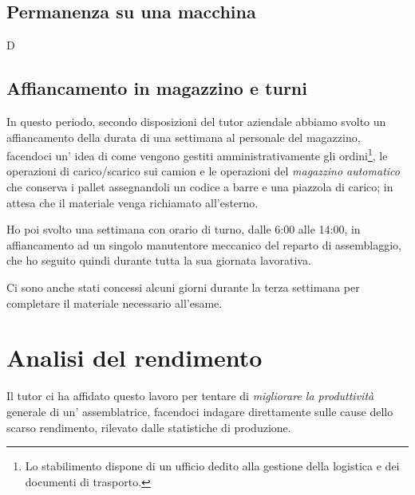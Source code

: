 \documentclass[a4paper,14pt,twoside]{extarticle} %
\begin{document}
\subsection{Permanenza su una macchina}
D
\subsection{Affiancamento in magazzino e turni}
In questo periodo, secondo disposizioni del tutor aziendale abbiamo svolto un affiancamento della durata di una settimana al personale del magazzino, facendoci un' idea di come vengono gestiti amministrativamente gli ordini\footnote{Lo stabilimento dispone di un ufficio dedito alla gestione della logistica e dei documenti di trasporto.}, le operazioni di carico/scarico sui camion e le operazioni del \emph{magazzino automatico} che conserva i pallet assegnandoli un codice a barre e una piazzola di carico; in attesa che il materiale venga richiamato all'esterno.

Ho poi svolto una settimana con orario di turno, dalle 6:00 alle 14:00, in affiancamento ad un singolo manutentore meccanico del reparto di assemblaggio, che ho seguito quindi durante tutta la sua giornata lavorativa.

Ci sono anche stati concessi alcuni giorni durante la terza settimana per completare il materiale necessario all'esame.
\newpage


\section{Analisi del rendimento}\label{sec:analisi}%
Il tutor ci ha affidato questo lavoro per tentare di \emph{migliorare la produttività} generale di un' assemblatrice, facendoci indagare direttamente sulle cause dello scarso rendimento, rilevato dalle statistiche di produzione.
\end{document}

